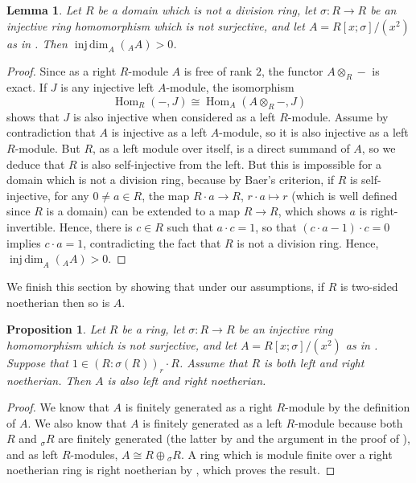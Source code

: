 \documentclass{amsart}
\newtheorem{prop}[equation]{Proposition}
\newtheorem{lem}[equation]{Lemma}
\theoremstyle{definition}
\newcommand{\opn}{\operatorname}
\newcommand{\injdim}{\operatorname{inj\,dim}}
\numberwithin{equation}{section}
\begin{document}
\begin{lem}\label{lem:not-inj}
Let $R$ be a domain which is not a division ring, let $\sigma:R \to R$ be an injective ring homomorphism which is not surjective,
and let $A = R[x;\sigma]/(x^2)$ as in .
Then $\injdim_A({}_A A) > 0$.
\end{lem}
\begin{proof}
Since as a right $R$-module $A$ is free of rank $2$,
the functor $A\otimes_R -$ is exact.
If $J$ is any injective left $A$-module,
the isomorphism
\[
\opn{Hom}_R(-,J) \cong \opn{Hom}_A(A\otimes_R -,J)
\]
shows that $J$ is also injective when considered as a left $R$-module.
Assume by contradiction that $A$ is injective as a left $A$-module,
so it is also injective as a left $R$-module.
But $R$, as a left module over itself, is a direct summand of $A$,
so we deduce that $R$ is also self-injective from the left.
But this is impossible for a domain which is not a division ring,
because by Baer's criterion, if $R$ is self-injective,
for any $0\ne a \in R$, the map $R\cdot a\to R$, $r\cdot a \mapsto r$ (which is well defined since $R$ is a domain)
can be extended to a map $R\to R$, which shows $a$ is right-invertible.
Hence, there is $c \in R$ such that $a\cdot c =1$, so that $(c\cdot a-1)\cdot c = 0$ implies $c\cdot a =1$,
contradicting the fact that $R$ is not a division ring.
Hence, $\injdim_A({}_A A) > 0$.
\end{proof}

We finish this section by showing that under our assumptions, if $R$ is two-sided noetherian then so is $A$.

\begin{prop}\label{prop:noeth}
Let $R$ be a ring, let $\sigma:R \to R$ be an injective ring homomorphism which is not surjective,
and let $A = R[x;\sigma]/(x^2)$ as in .
Suppose that 
$1 \in (R:\sigma(R))_r\cdot R$.
Assume that $R$ is both left and right noetherian.
Then $A$ is also left and right noetherian.
\end{prop}
\begin{proof}
We know that $A$ is finitely generated as a right $R$-module by the definition of $A$.
We also know that $A$ is finitely generated as a left $R$-module because both $R$ and ${}_\sigma R$ are finitely generated (the latter by  and the argument in the proof of ), and as left $R$-modules, $A \cong R \oplus {}_{\sigma} R$.
A ring which is module finite over a right noetherian ring is right noetherian by \cite[Lemma 1.1.3]{NCBook}, which proves the result.
\end{proof}
\end{document}
